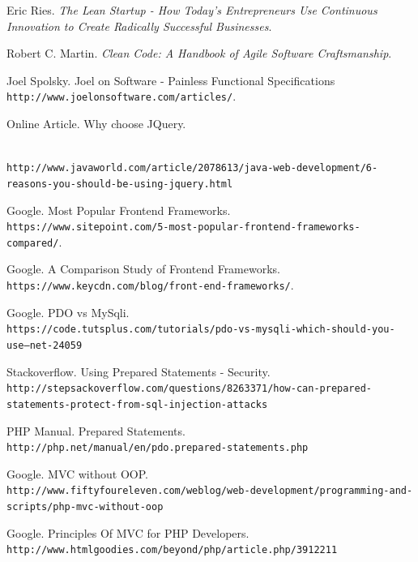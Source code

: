 \begin{thebibliography}{9}

\newcommand{\smallurl}[1]{{\footnotesize \texttt{#1}}}

Eric Ries. 
\textit{The Lean Startup - How Today's Entrepreneurs Use Continuous Innovation to Create Radically Successful Businesses}. 
 
Robert C. Martin.
\textit{Clean Code: A Handbook of Agile Software Craftsmanship}.

\bibitem{} 
Joel Spolsky. Joel on Software - Painless Functional Specifications
\\\texttt{http://www.joelonsoftware.com/articles/}.

\bibitem{} 
Online Article. Why choose JQuery.

\\\smallurl{http://www.javaworld.com/article/2078613/java-web-development/6-reasons-you-should-be-using-jquery.html}


\bibitem{} 
Google. Most Popular Frontend Frameworks.
\\\texttt{https://www.sitepoint.com/5-most-popular-frontend-frameworks-compared/}.

\bibitem{} 
Google. A Comparison Study of Frontend Frameworks.
\\\texttt{https://www.keycdn.com/blog/front-end-frameworks/}.

\bibitem{} 
Google. PDO vs MySqli.
\\\smallurl{https://code.tutsplus.com/tutorials/pdo-vs-mysqli-which-should-you-use--net-24059}

\bibitem{} 
Stackoverflow. Using Prepared Statements - Security.
\\\smallurl{http://stepsackoverflow.com/questions/8263371/how-can-prepared-statements-protect-from-sql-injection-attacks}

\bibitem{} 
PHP Manual. Prepared Statements.
\\\texttt{http://php.net/manual/en/pdo.prepared-statements.php}

\bibitem{} 
Google. MVC without OOP.
\\\texttt{http://www.fiftyfoureleven.com/weblog/web-development/programming-and-scripts/php-mvc-without-oop}


\bibitem{} 
Google. Principles Of MVC for PHP Developers.
\\\texttt{http://www.htmlgoodies.com/beyond/php/article.php/3912211}

\end{thebibliography}













 












